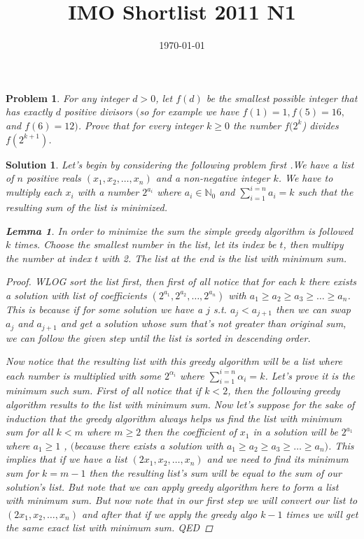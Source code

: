 \documentclass{article}
\title{IMO Shortlist 2011 N1}
\date{\today}
\newtheorem*{problem}{Problem}
\newtheorem*{solution}{Solution}
\newtheorem*{lemma}{Lemma}
\begin{document}
	
	\maketitle
	
	\begin{problem}
		For any integer $d > 0$, let $f(d)$ be the smallest
		possible integer that has exactly $d$ positive divisors $($so for example we have $f(1) = 1, f(5) =
		16,$ and $f(6) = 12)$. Prove that for every integer $k \geq 0$ the number $f(2^k$) divides $f(2^{k+1})$.
	\end{problem}
	
	\begin{solution}
		Let's begin by considering the following problem first .We have a list of $n$ positive reals $(x_1,x_2,\dots,x_n)$ and a non-negative integer $k$. We have to multiply each $x_i$ with a number $2^{a_i}$ where $a_i \in \mathbb{N}_0$ and 
		$\sum_{i=1}^{i=n} a_i = k$ such that the resulting sum of the list is minimized.
		\begin{lemma}
			In order to minimize the sum the simple greedy algorithm is followed $k$ times. Choose the smallest number in the list, let its index be $t$, then multipy the number at index $t$ with 2. The list at the end is the list with minimum sum.
		\end{lemma}
		\begin{proof}
			WLOG sort the list first, then
			first of all notice that for each $k$  there exists a solution with list of coefficients $(2^{a_1},2^{a_2},\dots,2^{a_n})$ with  $a_1 \geq a_2 \geq a_3 \geq \dots \geq a_n$. This is because if for some solution we have a $j$ s.t. $a_j < a_{j+1}$ then we can swap $a_j$ and $a_{j+1}$ and get a solution whose sum that's not greater than original sum, we can follow the given step until the list is sorted in descending order.
			
			Now notice that the resulting list with this greedy algorithm will be a list where each number is multiplied with some $2^{\alpha_i}$ where $\sum_{i=1}^{i=n} \alpha_i = k$. Let's prove it is the minimum such sum. First of all notice that if $k<2$, then the following greedy algorithm results to the list with minimum sum. Now let's suppose for the sake of induction that the greedy algorithm always helps us find the list with minimum sum for all $k < m$ where $m \geq 2$ then the coefficient of $x_1$ in a solution will be $2^{a_1}$ where $a_1 \geq 1$ , $($because there exists a solution with $a_1 \geq a_2 \geq a_3 \geq \dots \geq a_n)$. This implies that if we have a list $(2x_1,x_2,\dots,x_n)$ and we need to find its minimum sum for $k=m-1$ then the resulting list's sum will be equal to the sum of our solution's list. But note that we can apply greedy algorithm here to form a list with minimum sum. But now note that in our first step we will convert our list to $(2x_1,x_2,\dots,x_n)$ and after that if we apply the greedy algo $k-1$ times we will get the same exact list with minimum sum. QED
			

\end{proof}
\end{solution}
\end{document}
